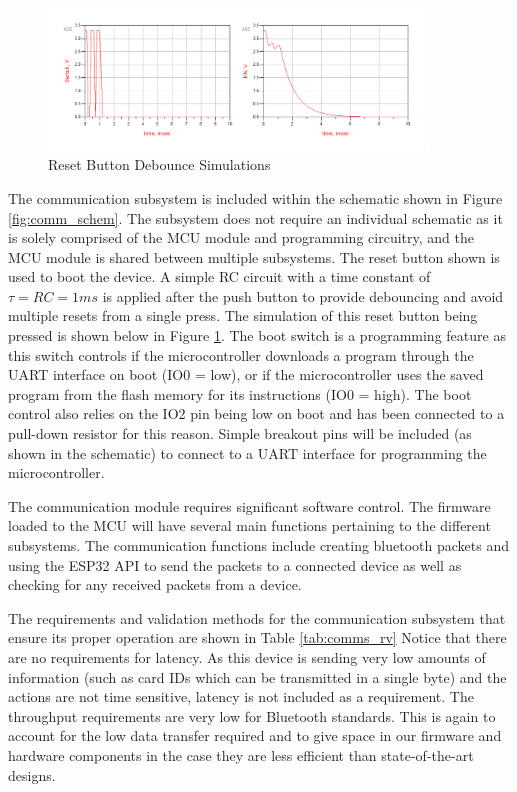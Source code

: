 \documentclass[12pt]{article}
\begin{document}
\begin{figure}[!h]
	\centering
	\includegraphics[width=0.9\textwidth]{reset_debounce.png}
	\caption{Reset Button Debounce Simulations}
	\label{fig:reset_debounce}
\end{figure}

The communication subsystem is included within the schematic shown in Figure \ref{fig:comm_schem}. The subsystem does not require an individual schematic as it is solely comprised of the MCU module and programming circuitry, and the MCU module is shared between multiple subsystems. The reset button shown is used to boot the device. A simple RC circuit with a time constant of $\tau = RC = 1ms$ is applied after the push button to provide debouncing and avoid multiple resets from a single press. The simulation of this reset button being pressed is shown below in Figure \ref{fig:reset_debounce}. The boot switch is a programming feature as this switch controls if the microcontroller downloads a program through the UART interface on boot (IO0 = low), or if the microcontroller uses the saved program from the flash memory for its instructions (IO0 = high). The boot control also relies on the IO2 pin being low on boot and has been connected to a pull-down resistor for this reason. Simple breakout pins will be included (as shown in the schematic) to connect to a UART interface for programming the microcontroller.

The communication module requires significant software control. The firmware loaded to the MCU will have several main functions pertaining to the different subsystems. The communication functions include creating bluetooth packets and using the ESP32 API to send the packets to a connected device as well as checking for any received packets from a device.

The requirements and validation methods for the communication subsystem that ensure its proper operation are shown in Table \ref{tab:comms_rv} Notice that there are no requirements for latency. As this device is sending very low amounts of information (such as card IDs which can be transmitted in a single byte) and the actions are not time sensitive, latency is not included as a requirement. The throughput requirements are very low for Bluetooth standards. This is again to account for the low data transfer required and to give space in our firmware and hardware components in the case they are less efficient than state-of-the-art designs.
\end{document}
